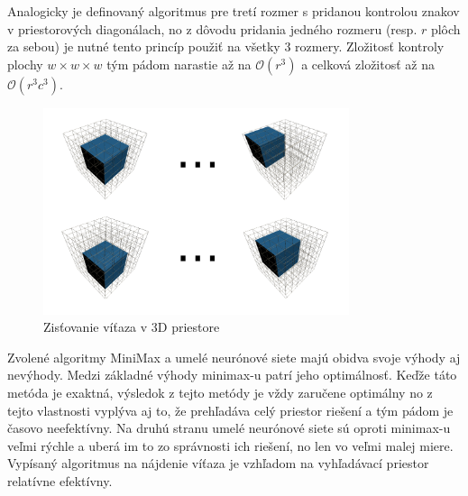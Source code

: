 Analogicky je definovaný algoritmus pre tretí rozmer s pridanou kontrolou znakov v priestorových diagonálach, no
z dôvodu pridania jedného rozmeru (resp. $r$ plôch za sebou) je nutné tento princíp použiť na všetky 3 rozmery.
Zložitosť kontroly plochy $w \times w \times w$ tým pádom narastie až na $\mathcal{O}(r^3)$ a celková zložitosť až na
$\mathcal{O}(r^3c^3)$.

\begin{figure}[H]
    \centering
    \includegraphics[width=0.8\textwidth]{images/winner-3D.png}
    \caption{Zisťovanie víťaza v 3D priestore}
\end{figure}

Zvolené algoritmy MiniMax a umelé neurónové siete majú obidva svoje výhody aj nevýhody.
Medzi základné výhody minimax-u patrí jeho optimálnosť.
Keďže táto metóda je exaktná, výsledok z tejto metódy je vždy zaručene optimálny no z tejto vlastnosti vyplýva aj to,
že prehľadáva celý priestor riešení a tým pádom je časovo neefektívny.
Na druhú stranu umelé neurónové siete sú oproti minimax-u veľmi rýchle a uberá im to zo správnosti ich riešení, no
len vo veľmi malej miere.
Vypísaný algoritmus na nájdenie víťaza je vzhľadom na vyhľadávací priestor relatívne efektívny.